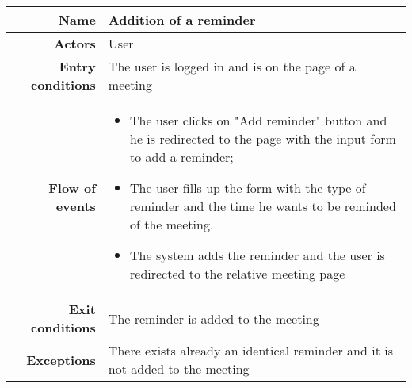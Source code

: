\begin{center}
\begin{tabular}{r|p{7cm}}
\bf\large Name&\bf\large Addition of a reminder\\
\hline
\hline
\bf Actors&User\\
\hline
\bf Entry conditions&The user is logged in and is on the page of a meeting\\
\hline
\bf Flow of events&
\begin{itemize}
\item The user clicks on "Add reminder" button and he is redirected to the page with the input form to add a reminder; 
\item  The user ﬁlls up the form with the type of reminder and the time he wants to be reminded of the meeting.
\item  The system adds the reminder and the user is redirected to the relative meeting page
\end{itemize}
\\
\hline
\bf Exit conditions&The reminder is added to the meeting \\
\hline
\bf Exceptions&There exists already an identical reminder and it is not added to the meeting\\
\hline

\end{tabular}
\end{center}